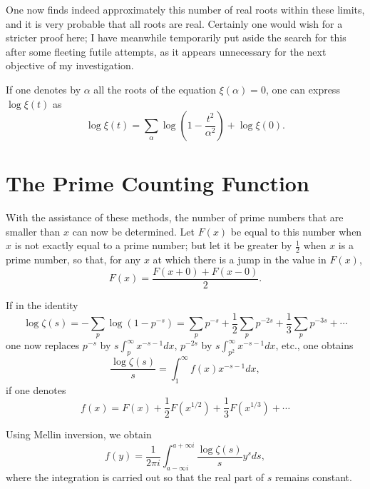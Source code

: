 \documentclass[12pt]{article}
\begin{document}
One now finds indeed approximately this number of real roots within these limits, and it is very probable that all roots are real. Certainly one would wish for a stricter proof here; I have meanwhile temporarily put aside the search for this after some fleeting futile attempts, as it appears unnecessary for the next objective of my investigation.

If one denotes by $\alpha$ all the roots of the equation $\xi(\alpha) = 0$, one can express $\log \xi(t)$ as
\begin{equation}
\log \xi(t) = \sum_{\alpha} \log\left(1 - \frac{t^2}{\alpha^2}\right) + \log \xi(0).
\label{eq:xi_product_form}
\end{equation}

\section{The Prime Counting Function}

With the assistance of these methods, the number of prime numbers that are smaller than $x$ can now be determined. Let $F(x)$ be equal to this number when $x$ is not exactly equal to a prime number; but let it be greater by $\frac{1}{2}$ when $x$ is a prime number, so that, for any $x$ at which there is a jump in the value in $F(x)$,
\begin{equation}
F(x) = \frac{F(x+0) + F(x-0)}{2}.
\label{eq:prime_counting_definition}
\end{equation}

If in the identity
\begin{equation}
\log \zeta(s) = -\sum_p \log(1-p^{-s}) = \sum_p p^{-s} + \frac{1}{2}\sum_p p^{-2s} + \frac{1}{3}\sum_p p^{-3s} + \cdots
\label{eq:zeta_prime_expansion}
\end{equation}
one now replaces $p^{-s}$ by $s \int_p^{\infty} x^{-s-1} dx$, $p^{-2s}$ by $s \int_{p^2}^{\infty} x^{-s-1} dx$, etc., one obtains
\begin{equation}
\frac{\log \zeta(s)}{s} = \int_1^{\infty} f(x) x^{-s-1} dx,
\label{eq:mellin_inversion_setup}
\end{equation}
if one denotes
\begin{equation}
f(x) = F(x) + \frac{1}{2}F(x^{1/2}) + \frac{1}{3}F(x^{1/3}) + \cdots
\label{eq:f_definition}
\end{equation}

Using Mellin inversion, we obtain
\begin{equation}
f(y) = \frac{1}{2\pi i} \int_{a-\infty i}^{a+\infty i} \frac{\log \zeta(s)}{s} y^s ds,
\label{eq:mellin_inversion}
\end{equation}
where the integration is carried out so that the real part of $s$ remains constant.
\end{document}
